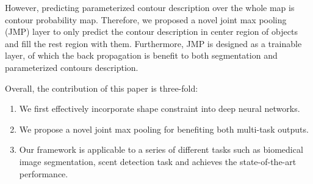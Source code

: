 However, predicting parameterized contour description over the whole map is  contour probability map.
Therefore, we proposed a novel joint max pooling (JMP) layer to only predict the contour description in center region of objects and fill the rest region with them.
Furthermore, JMP is designed as a trainable layer, of which the back propagation is benefit to both segmentation and parameterized contours description.

Overall, the contribution of this paper is three-fold:
\begin{enumerate}
	\item We first effectively incorporate shape constraint into deep neural networks.
	\item We propose a novel joint max pooling for benefiting both multi-task outputs.
	\item Our framework is applicable to a series of different tasks such as biomedical image segmentation, scent detection task and achieves the state-of-the-art performance.
\end{enumerate}


